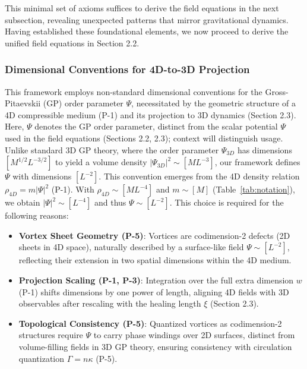 This minimal set of axioms suffices to derive the field equations in the next subsection, revealing unexpected patterns that mirror gravitational dynamics. Having established these foundational elements, we now proceed to derive the unified field equations in Section 2.2.

\subsubsection{Dimensional Conventions for 4D-to-3D Projection}
\label{subsec:dimensional_conventions}

This framework employs non-standard dimensional conventions for the Gross-Pitaevskii (GP) order parameter $\Psi$, necessitated by the geometric structure of a 4D compressible medium (P-1) and its projection to 3D dynamics (Section 2.3). Here, $\Psi$ denotes the GP order parameter, distinct from the scalar potential $\Psi$ used in the field equations (Sections 2.2, 2.3); context will distinguish usage. Unlike standard 3D GP theory, where the order parameter $\Psi_{3D}$ has dimensions $[M^{1/2} L^{-3/2}]$ to yield a volume density $|\Psi_{3D}|^2 \sim [M L^{-3}]$, our framework defines $\Psi$ with dimensions $[L^{-2}]$. This convention emerges from the 4D density relation $\rho_{4D} = m |\Psi|^2$ (P-1). With $\rho_{4D} \sim [M L^{-4}]$ and $m \sim [M]$ (Table~\ref{tab:notation}), we obtain $|\Psi|^2 \sim [L^{-4}]$ and thus $\Psi \sim [L^{-2}]$. This choice is required for the following reasons:

\begin{itemize}
    \item \textbf{Vortex Sheet Geometry (P-5)}: Vortices are codimension-2 defects (2D sheets in 4D space), naturally described by a surface-like field $\Psi \sim [L^{-2}]$, reflecting their extension in two spatial dimensions within the 4D medium.
    \item \textbf{Projection Scaling (P-1, P-3)}: Integration over the full extra dimension $w$ (P-1) shifts dimensions by one power of length, aligning 4D fields with 3D observables after rescaling with the healing length $\xi$ (Section 2.3).
    \item \textbf{Topological Consistency (P-5)}: Quantized vortices as codimension-2 structures require $\Psi$ to carry phase windings over 2D surfaces, distinct from volume-filling fields in 3D GP theory, ensuring consistency with circulation quantization $\Gamma = n \kappa$ (P-5).
\end{itemize}

